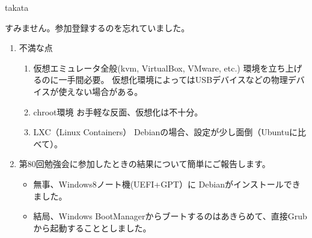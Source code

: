 \documentclass[mingoth,a4paper]{jsarticle}
\begin{document}
\begin{prework}{ takata }

すみません。参加登録するのを忘れていました。

 \begin{enumerate}

  \item 不満な点

        \begin{enumerate}
         \item 仮想エミュレータ全般(kvm, VirtualBox, VMware, etc.)
               環境を立ち上げるのに一手間必要。
               仮想化環境によってはUSBデバイスなどの物理デバイスが使えない場合がある。
         \item chroot環境
               お手軽な反面、仮想化は不十分。
         \item LXC（Linux Containers）
               Debianの場合、設定が少し面倒（Ubuntuに比べて）。
        \end{enumerate}

  \item 第80回勉強会に参加したときの結果について簡単にご報告します。

        \begin{itemize}
         \item 無事、Windows8ノート機(UEFI+GPT）に Debianがインストールできました。
         \item 結局、Windows BootManagerからブートするのはあきらめて、直接Grubから起動することとしました。
        \end{itemize}

 \end{enumerate}

\end{prework}
\end{document}
